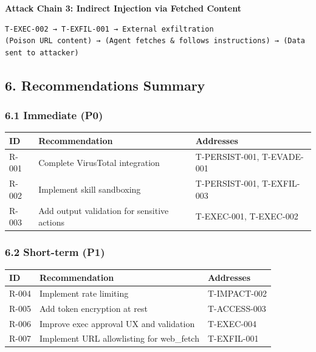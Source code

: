 \textbf{Attack Chain 3: Indirect Injection via Fetched Content}

\begin{lstlisting}
T-EXEC-002 → T-EXFIL-001 → External exfiltration
(Poison URL content) → (Agent fetches & follows instructions) → (Data sent to attacker)
\end{lstlisting}


\hrulefill


\subsection{6. Recommendations Summary}


\subsubsection{6.1 Immediate (P0)}



\begin{table}[h]
\centering
\small
\begin{tabular}{|l|l|l|}
\hline
ID & Recommendation & Addresses \\
\hline
R-001 & Complete VirusTotal integration & T-PERSIST-001, T-EVADE-001 \\
\hline
R-002 & Implement skill sandboxing & T-PERSIST-001, T-EXFIL-003 \\
\hline
R-003 & Add output validation for sensitive actions & T-EXEC-001, T-EXEC-002 \\
\hline
\end{tabular}
\end{table}



\subsubsection{6.2 Short-term (P1)}



\begin{table}[h]
\centering
\small
\begin{tabular}{|l|l|l|}
\hline
ID & Recommendation & Addresses \\
\hline
R-004 & Implement rate limiting & T-IMPACT-002 \\
\hline
R-005 & Add token encryption at rest & T-ACCESS-003 \\
\hline
R-006 & Improve exec approval UX and validation & T-EXEC-004 \\
\hline
R-007 & Implement URL allowlisting for web\_fetch & T-EXFIL-001 \\
\hline
\end{tabular}
\end{table}



